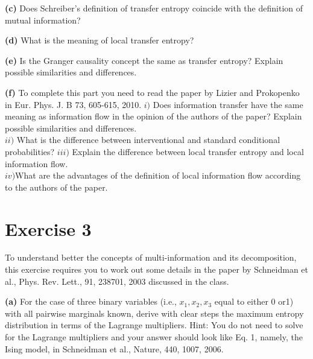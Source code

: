\documentclass[11pt]{article}
\begin{document}
\begin{tcolorbox}
\textbf{(c)}
Does Schreiber’s definition of transfer entropy coincide with the
definition of mutual information?
\end{tcolorbox}

\begin{tcolorbox}
\textbf{(d)}
What is the meaning of local transfer entropy?
\end{tcolorbox}

\begin{tcolorbox}
\textbf{(e)}
Is the Granger causality concept the same as transfer entropy?
Explain possible similarities and differences.
\end{tcolorbox}

\begin{tcolorbox}
\textbf{(f)}
To complete this part you need to read the paper by Lizier and Prokopenko in Eur. Phys. J. B 73, 605-615, 2010.
$i)$  Does information transfer have the same meaning as information flow in the opinion of the authors of the paper? Explain possible similarities and differences.\\
$ii)$ What is the difference between interventional and standard
conditional probabilities?
$iii)$ Explain the difference between local transfer entropy and local information flow.\\
$iv)$What are the advantages of the definition of local information flow according to the authors of the paper.\\
\end{tcolorbox}

\section{Exercise 3}

To understand better the concepts of multi-information and its decomposition, this exercise requires you to work out some details in the paper by Schneidman et al., Phys. Rev. Lett., 91, 238701, 2003 discussed in the class.

\begin{tcolorbox}
\textbf{(a)}
For the case of three binary variables (i.e., $x_{1}, x_{2}, x_{3}$ equal to either 0 or1) with all pairwise marginals known, derive with clear steps the maximum entropy distribution in terms of the Lagrange multipliers. Hint: You do not need to solve for the Lagrange multipliers and your answer should look like Eq. 1, namely, the Ising model, in Schneidman et al., Nature, 440, 1007, 2006.
\end{tcolorbox}
\end{document}
